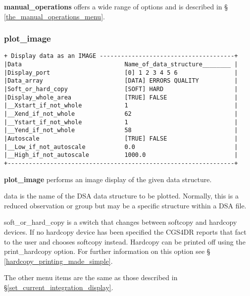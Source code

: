 {{\bf manual\_operations} offers a wide range of options and is described in \S 
\ref{the_manual_operations_menu}.

\subsubsection{plot\_image}
\label{plot_image}
\begin{verbatim}
+ Display data as an IMAGE --------------------------------------+
|Data                             Name_of_data_structure________ |
|Display_port                     [0] 1 2 3 4 5 6                |
|Data_array                       [DATA] ERRORS QUALITY          |
|Soft_or_hard_copy                [SOFT] HARD                    |
|Display_whole_area               [TRUE] FALSE                   |
|__Xstart_if_not_whole            1                              |
|__Xend_if_not_whole              62                             |
|__Ystart_if_not_whole            1                              |
|__Yend_if_not_whole              58                             |
|Autoscale                        [TRUE] FALSE                   |
|__Low_if_not_autoscale           0.0                            |
|__High_if_not_autoscale          1000.0                         |
+----------------------------------------------------------------+
\end{verbatim}

{\bf plot\_image} performs an image display of the given data structure.

{\sf data} is the name of the DSA data structure to be plotted. Normally,
this is a reduced observation or group but may be a specific structure
within a DSA file. 

{\sf soft\_or\_hard\_copy} is a switch that changes between softcopy
and hardcopy devices. If no hardcopy device has been specified the
CGS4DR reports that fact to the user and chooses softcopy instead. 
Hardcopy can be printed off using the {\sf print\_hardcopy} option.
For further information on this option see \S 
\ref{hardcopy_printing_made_simple}.

The other menu items are the same as those described
in \S \ref{set_current_integration_display}.

}
